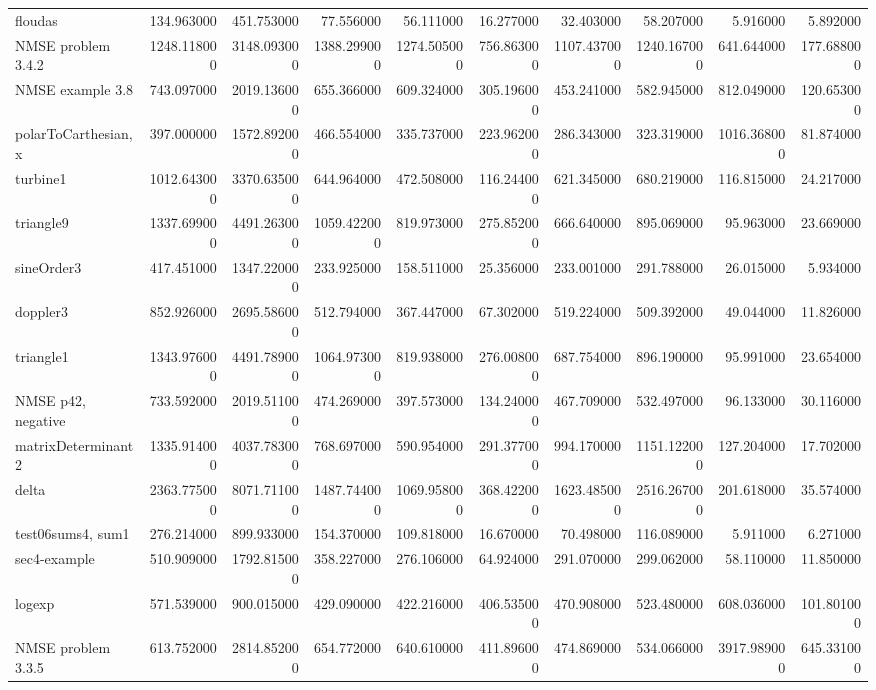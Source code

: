 \begin{longtable}{lrrrrrrrrr}
floudas & 134.963000 & 451.753000 & 77.556000 & 56.111000 & 16.277000 & 32.403000 & 58.207000 & 5.916000 & 5.892000 \\
NMSE problem 3.4.2 & 1248.118000 & 3148.093000 & 1388.299000 & 1274.505000 & 756.863000 & 1107.437000 & 1240.167000 & 641.644000 & 177.688000 \\
NMSE example 3.8 & 743.097000 & 2019.136000 & 655.366000 & 609.324000 & 305.196000 & 453.241000 & 582.945000 & 812.049000 & 120.653000 \\
polarToCarthesian, x & 397.000000 & 1572.892000 & 466.554000 & 335.737000 & 223.962000 & 286.343000 & 323.319000 & 1016.368000 & 81.874000 \\
turbine1 & 1012.643000 & 3370.635000 & 644.964000 & 472.508000 & 116.244000 & 621.345000 & 680.219000 & 116.815000 & 24.217000 \\
triangle9 & 1337.699000 & 4491.263000 & 1059.422000 & 819.973000 & 275.852000 & 666.640000 & 895.069000 & 95.963000 & 23.669000 \\
sineOrder3 & 417.451000 & 1347.220000 & 233.925000 & 158.511000 & 25.356000 & 233.001000 & 291.788000 & 26.015000 & 5.934000 \\
doppler3 & 852.926000 & 2695.586000 & 512.794000 & 367.447000 & 67.302000 & 519.224000 & 509.392000 & 49.044000 & 11.826000 \\
triangle1 & 1343.976000 & 4491.789000 & 1064.973000 & 819.938000 & 276.008000 & 687.754000 & 896.190000 & 95.991000 & 23.654000 \\
NMSE p42, negative & 733.592000 & 2019.511000 & 474.269000 & 397.573000 & 134.240000 & 467.709000 & 532.497000 & 96.133000 & 30.116000 \\
matrixDeterminant2 & 1335.914000 & 4037.783000 & 768.697000 & 590.954000 & 291.377000 & 994.170000 & 1151.122000 & 127.204000 & 17.702000 \\
delta & 2363.775000 & 8071.711000 & 1487.744000 & 1069.958000 & 368.422000 & 1623.485000 & 2516.267000 & 201.618000 & 35.574000 \\
test06sums4, sum1 & 276.214000 & 899.933000 & 154.370000 & 109.818000 & 16.670000 & 70.498000 & 116.089000 & 5.911000 & 6.271000 \\
sec4-example & 510.909000 & 1792.815000 & 358.227000 & 276.106000 & 64.924000 & 291.070000 & 299.062000 & 58.110000 & 11.850000 \\
logexp & 571.539000 & 900.015000 & 429.090000 & 422.216000 & 406.535000 & 470.908000 & 523.480000 & 608.036000 & 101.801000 \\
NMSE problem 3.3.5 & 613.752000 & 2814.852000 & 654.772000 & 640.610000 & 411.896000 & 474.869000 & 534.066000 & 3917.989000 & 645.331000 \\

\end{longtable}
